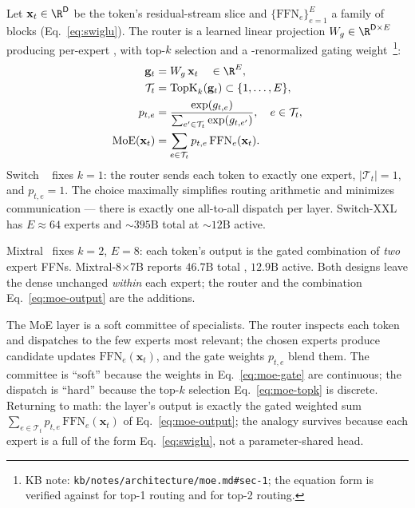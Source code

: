 Let $\mathbf{x}_t \in \R^{\mathsf{D}}$ be the token's residual-stream
slice and $\{\mathrm{FFN}_e\}_{e=1}^{E}$ a family of  blocks
(Eq.~\eqref{eq:swiglu}). The router is a learned linear projection
$W_g \in \R^{\mathsf{D} \times E}$ producing per-expert , with
top-$k$ selection and a -renormalized gating
weight~\citep[\S 2.1]{fedus2021-switch}\footnote{KB note:
\nolinkurl{kb/notes/architecture/moe.md#sec-1}; the equation form is
verified against \citet{fedus2021-switch} for top-1 routing and
\citet{mixtral2024} for top-2 routing. }:
\begin{align}
  \mathbf{g}_t       &= W_g\, \mathbf{x}_t \quad\in\R^{E}, \label{eq:moe-router} \\
  \mathcal{T}_t      &= \mathrm{TopK}_k(\mathbf{g}_t) \subset \{1,\dots,E\}, \label{eq:moe-topk} \\
  p_{t,e}            &= \frac{\exp(g_{t,e})}{\sum_{e' \in \mathcal{T}_t} \exp(g_{t,e'})}, \quad e \in \mathcal{T}_t, \label{eq:moe-gate} \\
  \mathrm{MoE}(\mathbf{x}_t) &= \sum_{e \in \mathcal{T}_t} p_{t,e}\,\mathrm{FFN}_e(\mathbf{x}_t). \label{eq:moe-output}
\end{align}
Switch ~\citep{fedus2021-switch} fixes $k = 1$: the router
sends each token to exactly one expert, $|\mathcal{T}_t| = 1$, and
$p_{t,e} = 1$. The choice maximally simplifies routing arithmetic
and minimizes communication --- there is exactly one all-to-all
dispatch per layer. Switch-XXL has $E \approx 64$ experts and
$\sim\!395\mathrm{B}$ total  at $\sim\!12\mathrm{B}$ active.

Mixtral~\citep{mixtral2024} fixes $k = 2$, $E = 8$: each token's
output is the gated combination of \emph{two} expert FFNs.
Mixtral-8$\times$7B reports $46.7\mathrm{B}$ total ,
$12.9\mathrm{B}$ active. Both designs leave the dense
  unchanged \emph{within} each expert; the router and the
combination Eq.~\eqref{eq:moe-output} are the additions.

\begin{analogy}
The MoE layer is a soft committee of specialists. The router inspects
each token and dispatches to the few experts most relevant; the chosen
experts produce candidate updates $\mathrm{FFN}_e(\mathbf{x}_t)$, and
the gate weights $p_{t,e}$ blend them. The committee is ``soft''
because the weights in Eq.~\eqref{eq:moe-gate} are continuous; the
dispatch is ``hard'' because the top-$k$ selection
Eq.~\eqref{eq:moe-topk} is discrete. Returning to math: the layer's
output is exactly the gated weighted sum
$\sum_{e \in \mathcal{T}_t} p_{t,e}\,\mathrm{FFN}_e(\mathbf{x}_t)$
of Eq.~\eqref{eq:moe-output}; the analogy survives because each
expert is a full   of the form Eq.~\eqref{eq:swiglu}, not a
parameter-shared head.
\end{analogy}

